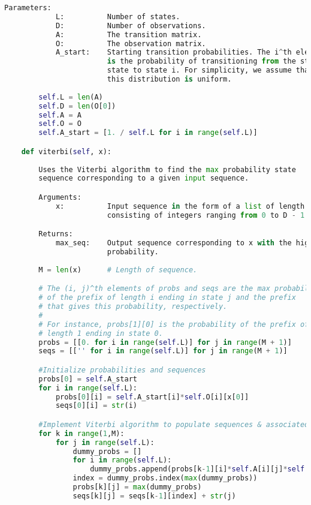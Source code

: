 \begin{lstlisting}[language=Python]
        Parameters:
            L:          Number of states.
            D:          Number of observations.
            A:          The transition matrix.
            O:          The observation matrix.
            A_start:    Starting transition probabilities. The i^th element
                        is the probability of transitioning from the start
                        state to state i. For simplicity, we assume that
                        this distribution is uniform.
        
        self.L = len(A)
        self.D = len(O[0])
        self.A = A
        self.O = O
        self.A_start = [1. / self.L for i in range(self.L)]

    def viterbi(self, x):
        
        Uses the Viterbi algorithm to find the max probability state 
        sequence corresponding to a given input sequence.

        Arguments:
            x:          Input sequence in the form of a list of length M,
                        consisting of integers ranging from 0 to D - 1.

        Returns:
            max_seq:    Output sequence corresponding to x with the highest
                        probability.
        
        M = len(x)      # Length of sequence.

        # The (i, j)^th elements of probs and seqs are the max probability
        # of the prefix of length i ending in state j and the prefix
        # that gives this probability, respectively.
        #
        # For instance, probs[1][0] is the probability of the prefix of
        # length 1 ending in state 0.
        probs = [[0. for i in range(self.L)] for j in range(M + 1)]
        seqs = [['' for i in range(self.L)] for j in range(M + 1)]

        #Initialize probabilities and sequences
        probs[0] = self.A_start
        for i in range(self.L):
            probs[0][i] = self.A_start[i]*self.O[i][x[0]]
            seqs[0][i] = str(i)

        #Implement Viterbi algorithm to populate sequences & associated probabilities
        for k in range(1,M):
            for j in range(self.L):
                dummy_probs = []
                for i in range(self.L):
                    dummy_probs.append(probs[k-1][i]*self.A[i][j]*self.O[j][x[k]])
                index = dummy_probs.index(max(dummy_probs))
                probs[k][j] = max(dummy_probs)
                seqs[k][j] = seqs[k-1][index] + str(j)
                

\end{lstlisting}
